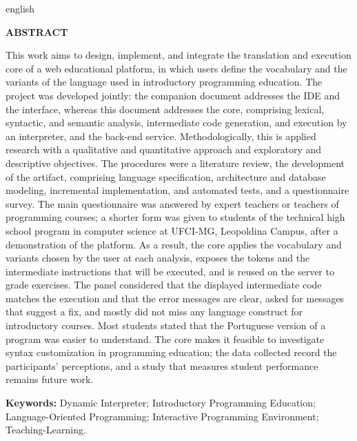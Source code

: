 \documentclass[
        oneside,      %
        english,			
        brazil			 
        ]{configcefetmglpd}
\begin{document}
 
\begin{abstract_cefetmg}
 \begin{otherlanguage*}{english}


\begin{center}
    \textbf{ABSTRACT} 
\end{center} 

This work aims to design, implement, and integrate the translation and execution core of a web educational platform, in which users define the vocabulary and the variants of the language used in introductory programming education. The project was developed jointly: the companion document addresses the IDE and the interface, whereas this document addresses the core, comprising lexical, syntactic, and semantic analysis, intermediate code generation, and execution by an interpreter, and the back-end service. Methodologically, this is applied research with a qualitative and quantitative approach and exploratory and descriptive objectives. The procedures were a literature review, the development of the artifact, comprising language specification, architecture and database modeling, incremental implementation, and automated tests, and a questionnaire survey. The main questionnaire was answered by expert teachers or teachers of programming courses; a shorter form was given to students of the technical high school program in computer science at UFCI-MG, Leopoldina Campus, after a demonstration of the platform. As a result, the core applies the vocabulary and variants chosen by the user at each analysis, exposes the tokens and the intermediate instructions that will be executed, and is reused on the server to grade exercises. The panel considered that the displayed intermediate code matches the execution and that the error messages are clear, asked for messages that suggest a fix, and mostly did not miss any language construct for introductory courses. Most students stated that the Portuguese version of a program was easier to understand. The core makes it feasible to investigate syntax customization in programming education; the data collected record the participants' perceptions, and a study that measures student performance remains future work.

\noindent
\textbf{Keywords:} Dynamic Interpreter; Introductory Programming Education; Language-Oriented Programming; Interactive Programming Environment; Teaching-Learning.%

  \end{otherlanguage*}
\end{abstract_cefetmg}
\end{document}
